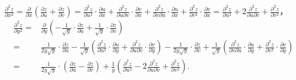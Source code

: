 \documentclass[../Main.tex]{subfiles}
\begin{document}
\begin{enumerate}
          $\frac{\partial^{2} z}{\partial x^{2}}= \frac{\partial}{\partial x}\left(\frac{\partial
                  z}{\partial u}+ \frac{\partial z}{\partial v}\right) = \frac{\partial^{2} z}{\partial
                  u^{2}}\cdot \frac{\partial u}{\partial x}+ \frac{\partial^{2} z}{\partial
                  u\partial v}\cdot \frac{\partial v}{\partial x}+ \frac{\partial^{2} z}{\partial
                  v\partial u}\cdot \frac{\partial u}{\partial x}+ \frac{\partial^{2} z}{\partial
                  v^{2}}\cdot \frac{\partial v}{\partial x}= \frac{\partial^{2} z}{\partial
                  u^{2}}+ 2\frac{\partial^{2} z}{\partial u\partial v}+ \frac{\partial^{2} z}{\partial
                  v^{2}}$，
          \[
              \begin{aligned}
                  \frac{\partial^{2} z}{\partial y^{2}} = & \frac{\partial}{\partial y}\left(-\frac{1}{\sqrt{y}}\cdot \frac{\partial z}{\partial u} + \frac{1}{\sqrt{y}}\cdot \frac{\partial z}{\partial v}\right)                                                                                                                                                                                                                                                                                                                                                    \\
                  =                                       & \frac{1}{2y\sqrt{y}}\cdot \frac{\partial z}{\partial u} - \frac{1}{\sqrt{y}}\left(\frac{\partial^{2} z}{\partial u^{2}}\cdot \frac{\partial u}{\partial y} + \frac{\partial^{2} z}{\partial u \partial v}\cdot \frac{\partial v}{\partial y}\right) - \frac{1}{2y\sqrt{y}}\cdot \frac{\partial z}{\partial v} + \frac{1}{\sqrt{y}}\left(\frac{\partial^{2} z}{\partial v \partial u}\cdot \frac{\partial u}{\partial y} + \frac{\partial^{2} z}{\partial v^{2}}\cdot \frac{\partial v}{\partial y}\right) \\
                  =                                       & \frac{1}{2y\sqrt{y}}\cdot \left(\frac{\partial z}{\partial u} - \frac{\partial z}{\partial v}\right) + \frac{1}{y}\left(\frac{\partial^{2} z}{\partial u^{2}} - 2\frac{\partial^{2} z}{\partial u \partial v} + \frac{\partial^{2} z}{\partial v^{2}}\right).
              \end{aligned}
          \]


\end{enumerate}
\end{document}
